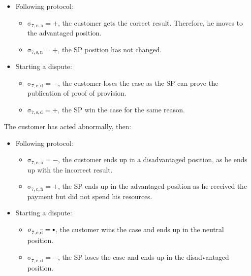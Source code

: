 \documentclass{ieeeaccess}
\newcommand\neutral[1][.75]{\mathbin{\ThisStyle{\vcenter{\hbox{%
  \scalebox{#1}{$\SavedStyle\bullet$}}}}}%
}
\begin{document}
\begin{itemize}
\item
  Following protocol:

  \begin{itemize}
  
  \item
    \(\operatorname{\sigma_{7, c, n} = +}\), the customer gets the correct result. Therefore, he moves to the advantaged position. 
  \item
    \(\operatorname{\sigma_{7, s, n} = +}\), the SP position has not changed. 
  \end{itemize}
\item
  Starting a dispute:

  \begin{itemize}
  
  \item
    \(\operatorname{\sigma_{7, c, d} = -}\), the customer loses the case as the SP can prove the publication of proof of provision. 
  \item
    \(\operatorname{\sigma_{7, s, d} = +}\), the SP win the case for the same reason.
  \end{itemize}
\end{itemize}

The customer has acted abnormally, then:

\begin{itemize}
\item
  Following protocol:

  \begin{itemize}
  
  \item
    \(\operatorname{\sigma_{7, c, \overline{n}} = -}\), the customer ends up in a disadvantaged position, as he ends up with the incorrect result.
  \item
    \(\operatorname{\sigma_{7, c, \overline{n}} = +}\), the SP ends up in the advantaged position as he received the payment but did not spend his resources.
  \end{itemize}
\item
  Starting a dispute:

  \begin{itemize}
  
  \item
    \(\operatorname{\sigma_{7, c, \overline{d}} = \neutral}\), the customer wins the case and ends up in the neutral position.
  \item
    \(\operatorname{\sigma_{7, c, \overline{d}} = -}\), the SP loses the case and ends up in the disadvantaged position.
  \end{itemize}
\end{itemize}
\end{document}
